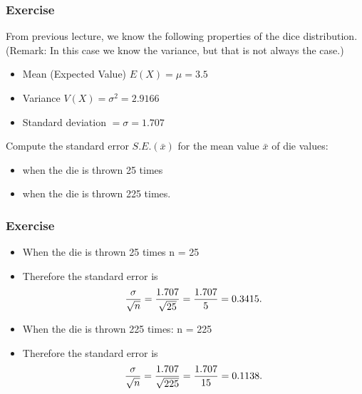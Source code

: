 \begin{frame}
\frametitle{Exercise}
From previous lecture, we know the following properties of the dice distribution. \\(Remark: In this case we know the variance, but that is not always the case.)
\begin{itemize}
\item Mean (Expected Value) $E(X) = \mu = 3.5$
\item Variance $V(X) = \sigma^2 = 2.9166$
\item Standard deviation $= \sigma = 1.707$
\end{itemize}

Compute the standard error $S.E.(\bar{x})$ for the mean value $\bar{x}$ of die values:
\begin{itemize}
\item when the die is thrown 25 times
\item when the die is thrown 225 times.
\end{itemize}
\end{frame}

\begin{frame}
\frametitle{Exercise}
\begin{itemize}
\item When the die is thrown 25 times n = 25
\item Therefore the standard error is
\[ {\sigma \over \sqrt{n}}  = {1.707 \over \sqrt{25}} = {1.707 \over 5} = 0.3415. \]
\item When the die is thrown 225 times: n = 225
\item Therefore the standard error is
\[ {\sigma \over \sqrt{n}}  = {1.707 \over \sqrt{225}} = {1.707 \over 15} = 0.1138. \]

\end{itemize}
\end{frame}

